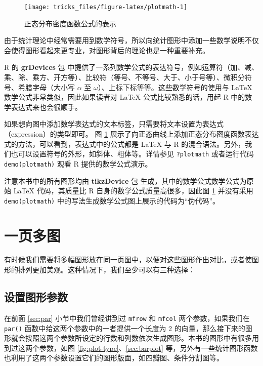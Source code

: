 \documentclass[
  b5paper,
  UTF8,twoside]{book}
\begin{document}
\begin{figure}

{\centering \texttt{[image: tricks\_files/figure-latex/plotmath-1]} 

}

\caption{正态分布密度函数公式的表示}\label{fig:plotmath}
\end{figure}

由于统计理论中经常需要用到数学符号，所以向统计图形中添加一些数学说明不仅会使得图形看起来更专业，对图形背后的理论也是一种重要补充。

R 的 \textbf{grDevices} 包 中提供了一系列数学公式的表达符号，例如运算符（加、减、乘、除、乘方、开方等）、比较符（等号、不等号、大于、小于号等）、微积分符号、希腊字母（大小写 \(\alpha\) 至 \(\omega\)）、上标下标等等。这些数学符号的使用与 LaTeX 数学公式非常类似，因此如果读者对 LaTeX 公式比较熟悉的话，用起 R 中的数学表达式来也会很顺手。

如果想向图中添加数学表达式的文本标签，只需要将文本设置为表达式（expression）的类型即可。 图 \ref{fig:plotmath} 展示了向正态曲线上添加正态分布密度函数表达式的方法，可以看到，表达式中的公式都是 LaTeX 与 R 的混合语法。另外，我们也可以设置符号的外形，如斜体、粗体等。详情参见 \texttt{?plotmath} 或者运行代码 \texttt{demo(plotmath)} 观看 R 提供的数学公式演示。

注意本书中的所有图形均由 \textbf{tikzDevice} 包 \citep{tikzDevice} 生成，其中的数学公式数学公式为原始 LaTeX 代码，其质量比 R 自身的数学公式质量高很多，因此图 \ref{fig:plotmath} 并没有采用 \texttt{demo(plotmath)} 中的写法生成数学公式图上展示的代码为``伪代码''。

\hypertarget{sec:multipage}{%
\section{一页多图}\label{sec:multipage}}

有时候我们需要将多幅图形放在同一页图中，以便对这些图形作出对比，或者使图形的排列更加美观。这种情况下，我们至少可以有三种选择：

\hypertarget{ux8bbeux7f6eux56feux5f62ux53c2ux6570}{%
\subsection{设置图形参数}\label{ux8bbeux7f6eux56feux5f62ux53c2ux6570}}

在前面 \ref{sec:par} 小节中我们曾经讲到过 \texttt{mfrow} 和 \texttt{mfcol} 两个参数，如果我们在 \texttt{par()} 函数中给这两个参数中的一者提供一个长度为 2 的向量，那么接下来的图形就会按照这两个参数所设定的行数和列数依次生成图形。本书的图形中有很多用到过这两个参数，如图 \ref{fig:plot-type}、\ref{sec:barplot} 等，另外有一些统计图形函数也利用了这两个参数设置它们的图形版面，如四瓣图、条件分割图等。
\end{document}

